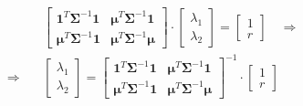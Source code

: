 \documentclass{beamer}
\begin{document}
\begin{frame}
\justifying
\begin{equation*}
\begin{aligned}
	& \begin{bmatrix}
		\mathbf{1}^{T} \mathbf{\Sigma}^{-1}\mathbf{1} & \boldsymbol\mu^{T} \mathbf{\Sigma}^{-1}\mathbf{1} \\
		\boldsymbol\mu^{T} \mathbf{\Sigma}^{-1}\mathbf{1} & \boldsymbol\mu^{T} \mathbf{\Sigma}^{-1}\boldsymbol\mu
	   \end{bmatrix}
	   \cdot
	   \begin{bmatrix}
		\lambda_{1}\\
		\lambda_{2}
	  \end{bmatrix}
	  =
	  \begin{bmatrix}
		1\\
		r
	\end{bmatrix}
	\quad \Rightarrow \\
	\Rightarrow \quad &
	\begin{bmatrix}
		\lambda_{1}\\
		\lambda_{2}
	  \end{bmatrix}
	  =
	  \begin{bmatrix}
		\mathbf{1}^{T} \mathbf{\Sigma}^{-1}\mathbf{1} & \boldsymbol\mu^{T} \mathbf{\Sigma}^{-1}\mathbf{1}\\
		\boldsymbol\mu^{T} \mathbf{\Sigma}^{-1}\mathbf{1} & \boldsymbol\mu^{T} \mathbf{\Sigma}^{-1}\boldsymbol\mu
	   \end{bmatrix}^{-1}
	   \cdot
	  \begin{bmatrix}
		1\\
		r
	\end{bmatrix}
\end{aligned}
\end{equation*}

\end{frame}
\end{document}
